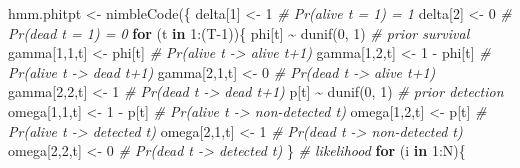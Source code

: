 \documentclass[
  12pt,
]{krantz}
\newenvironment{Shaded}{\begin{snugshade}}{\end{snugshade}}
\newcommand{\CommentTok}[1]{\textcolor[rgb]{0.56,0.35,0.01}{\textit{#1}}}
\newcommand{\ControlFlowTok}[1]{\textcolor[rgb]{0.13,0.29,0.53}{\textbf{#1}}}
\newcommand{\DecValTok}[1]{\textcolor[rgb]{0.00,0.00,0.81}{#1}}
\newcommand{\FunctionTok}[1]{\textcolor[rgb]{0.00,0.00,0.00}{#1}}
\newcommand{\NormalTok}[1]{#1}
\newcommand{\OtherTok}[1]{\textcolor[rgb]{0.56,0.35,0.01}{#1}}
\newcommand{\SpecialCharTok}[1]{\textcolor[rgb]{0.00,0.00,0.00}{#1}}
\begin{document}
\begin{Shaded}
\begin{Highlighting}[]
\NormalTok{hmm.phitpt }\OtherTok{\textless{}{-}} \FunctionTok{nimbleCode}\NormalTok{(\{}
\NormalTok{  delta[}\DecValTok{1}\NormalTok{] }\OtherTok{\textless{}{-}} \DecValTok{1}          \CommentTok{\# Pr(alive t = 1) = 1}
\NormalTok{  delta[}\DecValTok{2}\NormalTok{] }\OtherTok{\textless{}{-}} \DecValTok{0}          \CommentTok{\# Pr(dead t = 1) = 0}
  \ControlFlowTok{for}\NormalTok{ (t }\ControlFlowTok{in} \DecValTok{1}\SpecialCharTok{:}\NormalTok{(T}\DecValTok{{-}1}\NormalTok{))\{}
\NormalTok{    phi[t] }\SpecialCharTok{\textasciitilde{}} \FunctionTok{dunif}\NormalTok{(}\DecValTok{0}\NormalTok{, }\DecValTok{1}\NormalTok{) }\CommentTok{\# prior survival}
\NormalTok{    gamma[}\DecValTok{1}\NormalTok{,}\DecValTok{1}\NormalTok{,t] }\OtherTok{\textless{}{-}}\NormalTok{ phi[t]      }\CommentTok{\# Pr(alive t {-}\textgreater{} alive t+1)}
\NormalTok{    gamma[}\DecValTok{1}\NormalTok{,}\DecValTok{2}\NormalTok{,t] }\OtherTok{\textless{}{-}} \DecValTok{1} \SpecialCharTok{{-}}\NormalTok{ phi[t]  }\CommentTok{\# Pr(alive t {-}\textgreater{} dead t+1)}
\NormalTok{    gamma[}\DecValTok{2}\NormalTok{,}\DecValTok{1}\NormalTok{,t] }\OtherTok{\textless{}{-}} \DecValTok{0}        \CommentTok{\# Pr(dead t {-}\textgreater{} alive t+1)}
\NormalTok{    gamma[}\DecValTok{2}\NormalTok{,}\DecValTok{2}\NormalTok{,t] }\OtherTok{\textless{}{-}} \DecValTok{1}        \CommentTok{\# Pr(dead t {-}\textgreater{} dead t+1)}
\NormalTok{    p[t] }\SpecialCharTok{\textasciitilde{}} \FunctionTok{dunif}\NormalTok{(}\DecValTok{0}\NormalTok{, }\DecValTok{1}\NormalTok{) }\CommentTok{\# prior detection}
\NormalTok{    omega[}\DecValTok{1}\NormalTok{,}\DecValTok{1}\NormalTok{,t] }\OtherTok{\textless{}{-}} \DecValTok{1} \SpecialCharTok{{-}}\NormalTok{ p[t]    }\CommentTok{\# Pr(alive t {-}\textgreater{} non{-}detected t)}
\NormalTok{    omega[}\DecValTok{1}\NormalTok{,}\DecValTok{2}\NormalTok{,t] }\OtherTok{\textless{}{-}}\NormalTok{ p[t]        }\CommentTok{\# Pr(alive t {-}\textgreater{} detected t)}
\NormalTok{    omega[}\DecValTok{2}\NormalTok{,}\DecValTok{1}\NormalTok{,t] }\OtherTok{\textless{}{-}} \DecValTok{1}        \CommentTok{\# Pr(dead t {-}\textgreater{} non{-}detected t)}
\NormalTok{    omega[}\DecValTok{2}\NormalTok{,}\DecValTok{2}\NormalTok{,t] }\OtherTok{\textless{}{-}} \DecValTok{0}        \CommentTok{\# Pr(dead t {-}\textgreater{} detected t)}
\NormalTok{  \}}
  \CommentTok{\# likelihood}
  \ControlFlowTok{for}\NormalTok{ (i }\ControlFlowTok{in} \DecValTok{1}\SpecialCharTok{:}\NormalTok{N)\{}

\end{Highlighting}
\end{Shaded}
\end{document}
